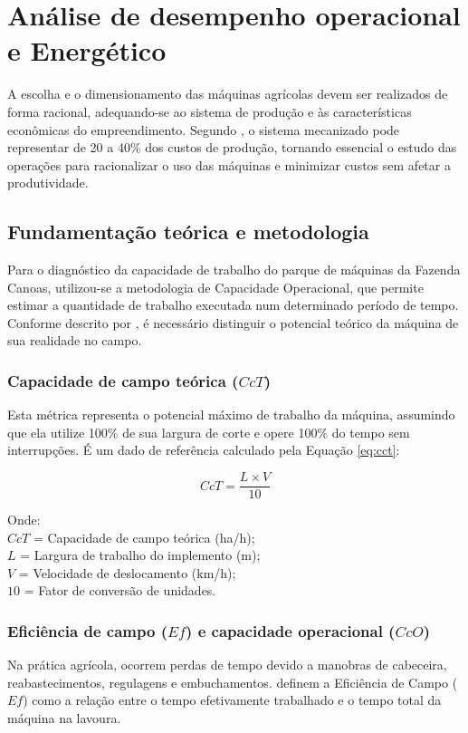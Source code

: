 \documentclass[12pt,openright,oneside,a4paper,hidelinks,espacamento=1.5]{abntex2}
\begin{document}
\chapter{Análise de desempenho operacional e Energético}

A escolha e o dimensionamento das máquinas agrícolas devem ser realizados de forma racional, adequando-se ao sistema de produção e às características econômicas do empreendimento. Segundo , o sistema mecanizado pode representar de 20 a 40\% dos custos de produção, tornando essencial o estudo das operações para racionalizar o uso das máquinas e minimizar custos sem afetar a produtividade.

\section{Fundamentação teórica e metodologia}

Para o diagnóstico da capacidade de trabalho do parque de máquinas da Fazenda Canoas, utilizou-se a metodologia de Capacidade Operacional, que permite estimar a quantidade de trabalho executada num determinado período de tempo. Conforme descrito por , é necessário distinguir o potencial teórico da máquina de sua realidade no campo.

\subsection{Capacidade de campo teórica ($CcT$)}
Esta métrica representa o potencial máximo de trabalho da máquina, assumindo que ela utilize 100\% de sua largura de corte e opere 100\% do tempo sem interrupções. É um dado de referência calculado pela Equação \ref{eq:cct}:

\begin{equation} \label{eq:cct}
    CcT = \frac{L \times V}{10}
\end{equation}

\noindent Onde:\\
$CcT$ = Capacidade de campo teórica (ha/h);\\
$L$ = Largura de trabalho do implemento (m);\\
$V$ = Velocidade de deslocamento (km/h);\\
$10$ = Fator de conversão de unidades.

\subsection{Eficiência de campo ($Ef$) e capacidade operacional ($CcO$)}
Na prática agrícola, ocorrem perdas de tempo devido a manobras de cabeceira, reabastecimentos, regulagens e embuchamentos.  definem a Eficiência de Campo ($Ef$) como a relação entre o tempo efetivamente trabalhado e o tempo total da máquina na lavoura.
\end{document}
